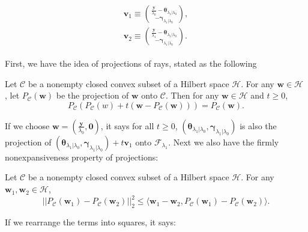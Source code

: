 \begin{gather}
    \label{eq:1.2.1}
    \begin{aligned}
        \boldsymbol v_1\equiv\binom{\frac{\boldsymbol y}{\lambda_0}-\boldsymbol \theta_{\lambda_1|\lambda_0}}{-\boldsymbol \gamma_{\lambda_1|\lambda_0}},\\
        \boldsymbol v_2\equiv \binom{\frac{\boldsymbol y}{\lambda_1}-\boldsymbol \theta_{\lambda_1|\lambda_0}}{-\boldsymbol \gamma_{\lambda_1|\lambda_0}}.
    \end{aligned}
\end{gather}

First, we have the idea of projections of rays, stated as the following

\begin{lemma}
    \citep{Bauschke2011}
    Let $\mathcal{C}$ be a nonempty closed convex subset of a Hilbert space $\mathcal{H}$. For any $\boldsymbol w\in\mathcal{H}$ , let $P_{\mathcal{C}}(\boldsymbol w)$ be the projection of $\boldsymbol w$ onto $\mathcal{C}$. Then for any $\boldsymbol w\in\mathcal{H}$ and $t\geq 0$,
    \begin{equation}
        P_{\mathcal{C}}\left(P_{\mathcal{C}}(w)+t\left(\boldsymbol w-P_{\mathcal{C}}(\boldsymbol w)\right)\right)=P_{\mathcal{C}}(\boldsymbol w).
    \end{equation}
\end{lemma}

If we choose $\boldsymbol w=(\frac{\boldsymbol y}{\lambda_0},\boldsymbol0)$, it says for all $t\geq 0$, $(\boldsymbol \theta_{\lambda_1|\lambda_0},\boldsymbol \gamma_{\lambda_1|\lambda_0})$ is also the projection of $(\boldsymbol \theta_{\lambda_1|\lambda_0},\boldsymbol \gamma_{\lambda_1|\lambda_0})+t\boldsymbol v_1$ onto $\mathcal{F}_{\lambda_1}$. Next we also have the firmly nonexpansiveness property of projections:

\begin{lemma}
    \citep{Bauschke2011}
    Let $\mathcal{C}$ be a nonempty closed convex subset of a Hilbert space $\mathcal{H}$. For any $\boldsymbol w_1,\boldsymbol w_2\in\mathcal{H}$,
    \begin{equation}
        ||P_{\mathcal{C}}(\boldsymbol w_1)-P_{\mathcal{C}}(\boldsymbol w_2)||_2^2\leq \langle\boldsymbol w_1-\boldsymbol w_2, P_{\mathcal{C}}(\boldsymbol w_1)-P_{\mathcal{C}}(\boldsymbol w_2)\rangle.
    \end{equation}
\end{lemma}

If we rearrange the terms into squares, it says:

